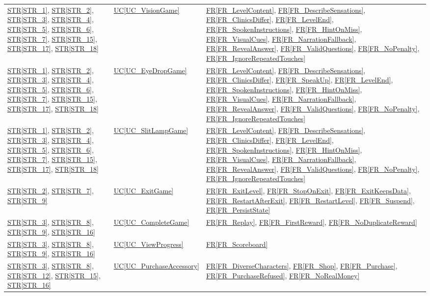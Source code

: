 \documentclass[10pt]{article}
\newcommand{\strref}[1]{\hyperref[#1]{STR\ref*{#1}}}
\newcommand{\ucref}[1]{\hyperref[#1]{UC\ref*{#1}}}
\newcommand{\rref}[1]{\hyperref[#1]{FR\ref*{#1}}}
\begin{document}
\begin{longtable}{@{}p{} p{} p{}@{}}
\strref{STR_1}, \strref{STR_2}, \strref{STR_3}, \strref{STR_4}, \strref{STR_5}, 
\strref{STR_6}, \strref{STR_7}, \strref{STR_15}, \strref{STR_17}, \strref{STR_18} 
& \ucref{UC_VisionGame} & \rref{FR_LevelContent}, \rref{FR_DescribeSensations}, \rref{FR_ClinicsDiffer}, \rref{FR_LevelEnd}, \rref{FR_SpokenInstructions}, \rref{FR_HintOnMiss}, \rref{FR_VisualCues}, \rref{FR_NarrationFallback}, \rref{FR_RevealAnswer}, \rref{FR_ValidQuestions}, \rref{FR_NoPenalty}, \rref{FR_IgnoreRepeatedTouches} \\

\strref{STR_1}, \strref{STR_2}, \strref{STR_3}, \strref{STR_4}, \strref{STR_5}, 
\strref{STR_6}, \strref{STR_7}, \strref{STR_15}, \strref{STR_17}, \strref{STR_18} 
& \ucref{UC_EyeDropGame} & \rref{FR_LevelContent}, \rref{FR_DescribeSensations}, \rref{FR_ClinicsDiffer}, \rref{FR_SpeakUp}, \rref{FR_LevelEnd}, \rref{FR_SpokenInstructions}, \rref{FR_HintOnMiss}, \rref{FR_VisualCues}, \rref{FR_NarrationFallback}, \rref{FR_RevealAnswer}, \rref{FR_ValidQuestions}, \rref{FR_NoPenalty}, \rref{FR_IgnoreRepeatedTouches} \\

\strref{STR_1}, \strref{STR_2}, \strref{STR_3}, \strref{STR_4}, \strref{STR_5}, 
\strref{STR_6}, \strref{STR_7}, \strref{STR_15}, \strref{STR_17}, \strref{STR_18} 
& \ucref{UC_SlitLampGame} & \rref{FR_LevelContent}, \rref{FR_DescribeSensations}, \rref{FR_ClinicsDiffer}, \rref{FR_LevelEnd}, \rref{FR_SpokenInstructions}, \rref{FR_HintOnMiss}, \rref{FR_VisualCues}, \rref{FR_NarrationFallback}, \rref{FR_RevealAnswer}, \rref{FR_ValidQuestions}, \rref{FR_NoPenalty}, \rref{FR_IgnoreRepeatedTouches} \\

\strref{STR_2}, \strref{STR_7}, \strref{STR_9} 
& \ucref{UC_ExitGame} & \rref{FR_ExitLevel}, \rref{FR_StopOnExit}, \rref{FR_ExitKeepsData}, \rref{FR_RestartAfterExit}, \rref{FR_RestartLevel}, \rref{FR_Suspend}, \rref{FR_PersistState} \\

\strref{STR_3}, \strref{STR_8}, \strref{STR_9}, \strref{STR_16} 
& \ucref{UC_CompleteGame} & \rref{FR_Replay}, \rref{FR_FirstReward}, \rref{FR_NoDuplicateReward} \\

\strref{STR_3}, \strref{STR_8}, \strref{STR_9}, \strref{STR_16} 
& \ucref{UC_ViewProgress} & \rref{FR_Scoreboard} \\

\strref{STR_3}, \strref{STR_8}, \strref{STR_12}, \strref{STR_15}, \strref{STR_16} 
& \ucref{UC_PurchaseAccessory} & \rref{FR_DiverseCharacters}, \rref{FR_Shop}, \rref{FR_Purchase}, \rref{FR_PurchaseRefused}, \rref{FR_NoRealMoney} \\


\end{longtable}
\end{document}
